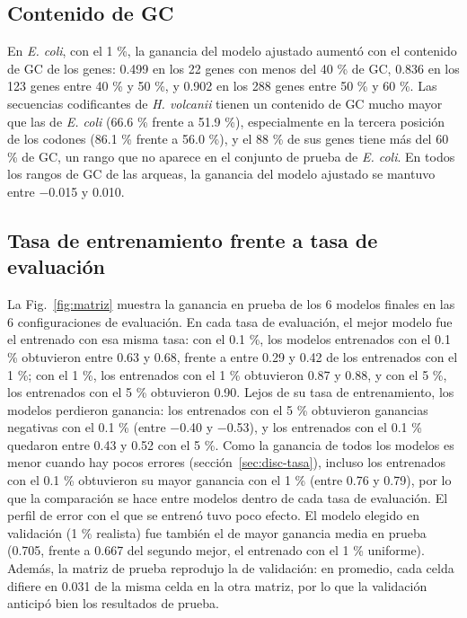 \documentclass[sigconf,nonacm]{acmart}
\begin{document}
\subsection{Contenido de GC}\label{sec:res-gc}

En \emph{E. coli}, con el 1 \%, la ganancia del modelo ajustado aumentó con el contenido de GC de los genes: 0.499 en los 22 genes con menos del 40 \% de GC, 0.836 en los 123 genes entre 40 \% y 50 \%, y 0.902 en los 288 genes entre 50 \% y 60 \%. Las secuencias codificantes de \emph{H. volcanii} tienen un contenido de GC mucho mayor que las de \emph{E. coli} (66.6 \% frente a 51.9 \%), especialmente en la tercera posición de los codones (86.1 \% frente a 56.0 \%), y el 88 \% de sus genes tiene más del 60 \% de GC, un rango que no aparece en el conjunto de prueba de \emph{E. coli}. En todos los rangos de GC de las arqueas, la ganancia del modelo ajustado se mantuvo entre −0.015 y 0.010.

\subsection{Tasa de entrenamiento frente a tasa de evaluación}\label{sec:res-matriz}

La Fig.~\ref{fig:matriz} muestra la ganancia en prueba de los 6 modelos finales en las 6 configuraciones de evaluación. En cada tasa de evaluación, el mejor modelo fue el entrenado con esa misma tasa: con el 0.1 \%, los modelos entrenados con el 0.1 \% obtuvieron entre 0.63 y 0.68, frente a entre 0.29 y 0.42 de los entrenados con el 1 \%; con el 1 \%, los entrenados con el 1 \% obtuvieron 0.87 y 0.88, y con el 5 \%, los entrenados con el 5 \% obtuvieron 0.90. Lejos de su tasa de entrenamiento, los modelos perdieron ganancia: los entrenados con el 5 \% obtuvieron ganancias negativas con el 0.1 \% (entre −0.40 y −0.53), y los entrenados con el 0.1 \% quedaron entre 0.43 y 0.52 con el 5 \%. Como la ganancia de todos los modelos es menor cuando hay pocos errores (sección~\ref{sec:disc-tasa}), incluso los entrenados con el 0.1 \% obtuvieron su mayor ganancia con el 1 \% (entre 0.76 y 0.79), por lo que la comparación se hace entre modelos dentro de cada tasa de evaluación. El perfil de error con el que se entrenó tuvo poco efecto. El modelo elegido en validación (1 \% realista) fue también el de mayor ganancia media en prueba (0.705, frente a 0.667 del segundo mejor, el entrenado con el 1 \% uniforme). Además, la matriz de prueba reprodujo la de validación: en promedio, cada celda difiere en 0.031 de la misma celda en la otra matriz, por lo que la validación anticipó bien los resultados de prueba.
\end{document}
